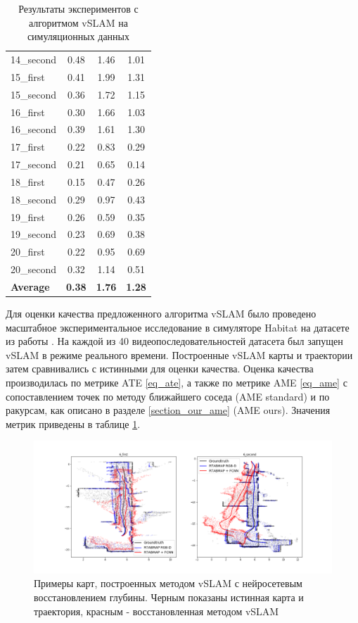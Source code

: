 \documentclass{mipt-thesis-ms}
\begin{document}
\begin{table}
\begin{tabular}{l|c|c|c}
			14\_second & 0.48 & 1.46 & 1.01 \\
			15\_first & 0.41 & 1.99 & 1.31 \\
			15\_second & 0.36 & 1.72 & 1.15 \\
			16\_first & 0.30 & 1.66 & 1.03 \\
			16\_second & 0.39 & 1.61 & 1.30 \\
			17\_first & 0.22 & 0.83 & 0.29 \\
			17\_second & 0.21 & 0.65 & 0.14 \\
			18\_first & 0.15 & 0.47 & 0.26 \\
			18\_second & 0.29 & 0.97 & 0.43 \\
			19\_first & 0.26 & 0.59 & 0.35 \\
			19\_second & 0.23 & 0.69 & 0.38 \\
			20\_first & 0.22 & 0.95 & 0.69 \\
			20\_second & 0.32 & 1.14 & 0.51 \\
			\hline
			\textbf{Average}                       &   \textbf{0.38}                          & \textbf{1.76}                          & \textbf{1.28}\\                         
		\end{tabular}
		\caption{Результаты экспериментов с алгоритмом vSLAM на симуляционных данных}
		\label{table_maomaps_results}
	\end{table}
	
	Для оценки качества предложенного алгоритма vSLAM было проведено масштабное экспериментальное исследование в симуляторе Habitat \cite{savva2019habitat} на датасете из работы \cite{bokovoy2021maomaps}. На каждой из 40 видеопоследовательностей датасета был запущен vSLAM в режиме реального времени. Построенные vSLAM карты и траектории затем сравнивались с истинными для оценки качества. Оценка качества производилась по метрике ATE \ref{eq_ate}, а также по метрике AME \ref{eq_ame} с сопоставлением точек по методу ближайшего соседа (AME standard) и по ракурсам, как описано в разделе \ref{section_our_ame} (AME ours). Значения метрик приведены в таблице \ref{table_maomaps_results}.
	
	\begin{figure}
		\includegraphics[width=1.0\textwidth]{img/fcnn_maps_sample6.png}
		\caption{Примеры карт, построенных методом vSLAM с нейросетевым восстановлением глубины. Черным показаны истинная карта и траектория, красным - восстановленная методом vSLAM}
		\label{figure_slam_map_example}
	\end{figure}
	
\end{document}
